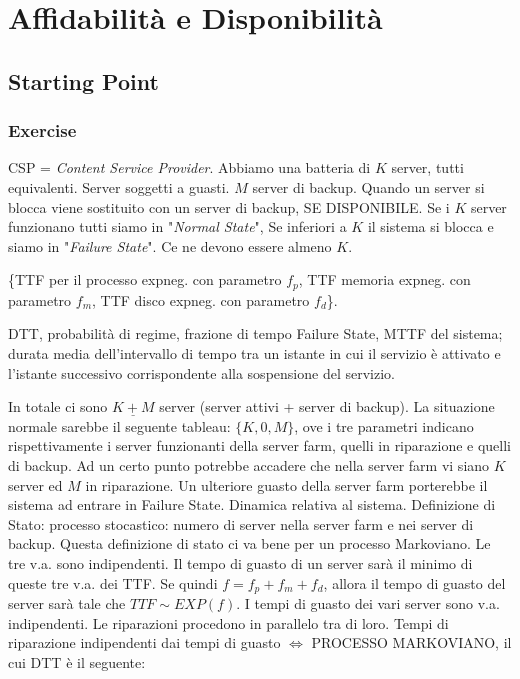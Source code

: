 
\chapter{Affidabilità e Disponibilità}
\label{cap:relavl}

\section{Starting Point}

\subsection{Exercise}

CSP = \textit{Content Service Provider}. Abbiamo una batteria di $K$ server, tutti equivalenti. Server soggetti a guasti. $M$ server di backup. Quando un server si blocca viene sostituito con un server di backup, SE DISPONIBILE. Se i $K$ server funzionano tutti siamo in "\textit{Normal State}", Se inferiori a $K$ il sistema si blocca e siamo in "\textit{Failure State}". Ce ne devono essere almeno $K$.

\{TTF per il processo expneg. con parametro $f_p$, TTF memoria expneg. con parametro $f_m$, TTF disco expneg. con parametro $f_d$\}.

DTT, probabilità di regime, frazione di tempo Failure State, MTTF del sistema; durata media dell'intervallo di tempo tra un istante in cui il servizio è attivato e l'istante successivo corrispondente alla sospensione del servizio.

In totale ci sono $\underline{K+M}$ server (server attivi + server di backup). La situazione normale sarebbe il seguente tableau: $\{K,0,M\}$, ove i tre parametri indicano rispettivamente i server funzionanti della server farm, quelli in riparazione e quelli di backup. Ad un certo punto potrebbe accadere che nella server farm vi siano $K$ server ed $M$ in riparazione. Un ulteriore guasto della server farm porterebbe il sistema ad entrare in Failure State. Dinamica relativa al sistema. Definizione di Stato: processo stocastico: numero di server nella server farm e nei server di backup. Questa definizione di stato ci va bene per un processo Markoviano. Le tre v.a. sono indipendenti. Il tempo di guasto di un server sarà il minimo di queste tre v.a. dei TTF. Se quindi $f=f_p+f_m+f_d$, allora il tempo di guasto del server sarà tale che $TTF \sim EXP(f)$. I tempi di guasto dei vari server sono v.a. indipendenti. Le riparazioni procedono in parallelo tra di loro. Tempi di riparazione indipendenti dai tempi di guasto $\iff$ PROCESSO MARKOVIANO, il cui DTT è il seguente:

